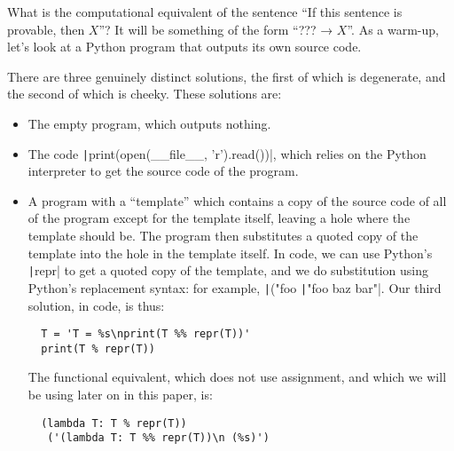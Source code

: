 

 What is the computational equivalent of the sentence ``If this
 sentence is provable, then $X$''?  It will be something of the form
 ``??? → $X$''.  As a warm-up, let's look at a Python program that
 outputs its own source code.

 There are three genuinely distinct solutions, the first of which is
 degenerate, and the second of which is cheeky.  These solutions are:
 \label{sec:python-quine}
 \begin{itemize}
   \item The empty program, which outputs nothing.
   \item The code
     \texttt|print(open(__file__, 'r').read())|,
     which relies on the Python interpreter to get the
     source code of the program.

   \item A program with a ``template'' which contains a copy of the
     source code of all of the program except for the template itself,
     leaving a hole where the template should be.  The program then
     substitutes a quoted copy of the template into the hole in the
     template itself.  In code, we can use Python's
     \texttt|repr| to get a quoted copy of the template,
     and we do substitution using Python's replacement syntax: for
     example, \texttt|("foo %
     \texttt|"foo baz bar"|.  Our third solution, in code,
     is thus:
\begin{verbatim}
  T = 'T = %s\nprint(T %% repr(T))'
  print(T % repr(T))
\end{verbatim}

    The functional equivalent, which does not use assignment, and
    which we will be using later on in this paper, is:
\begin{verbatim}
  (lambda T: T % repr(T))
   ('(lambda T: T %% repr(T))\n (%s)')
\end{verbatim}

  \end{itemize}

